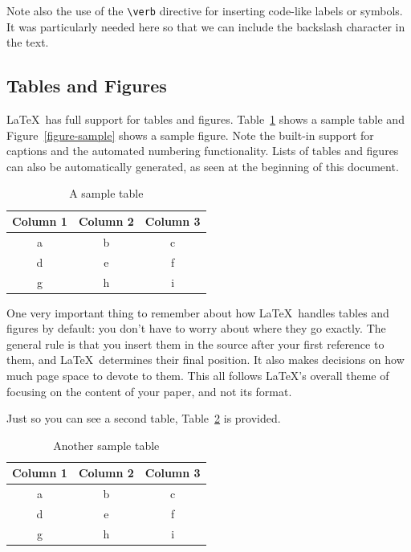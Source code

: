 \documentclass{article}
\begin{document}
Note also the use of the \verb!\verb! directive for inserting code-like labels or symbols.  It was particularly needed here so that we can include the backslash character in the text.

\subsection{Tables and Figures}

\LaTeX\ has full support for tables and figures.  Table~\ref{table-sample} shows a sample table and Figure~\ref{figure-sample} shows a sample figure.  Note the built-in support for captions and the automated numbering functionality.  Lists of tables and figures can also be automatically generated, as seen at the beginning of this document.

\begin{table}
\centering
\begin{tabular}{|c|c|c|}\hline
Column 1 & Column 2 & Column 3 \\\hline\hline
a & b & c \\
d & e & f \\
g & h & i \\\hline
\end{tabular}

\caption{A sample table}
\label{table-sample}
\end{table}



One very important thing to remember about how \LaTeX\ handles tables and figures by default: you don't have to worry about where they go exactly.  The general rule is that you insert them in the source after your first reference to them, and \LaTeX\ determines their final position.  It also makes decisions on how much page space to devote to them.  This all follows \LaTeX's overall theme of focusing on the content of your paper, and not its format.

Just so you can see a second table, Table~\ref{table-sample2} is provided.

\begin{table}
\centering
\begin{tabular}{|c|c|c|}\hline
Column 1 & Column 2 & Column 3 \\\hline\hline
a & b & c \\
d & e & f \\
g & h & i \\\hline
\end{tabular}

\caption{Another sample table}
\label{table-sample2}
\end{table}
\end{document}
